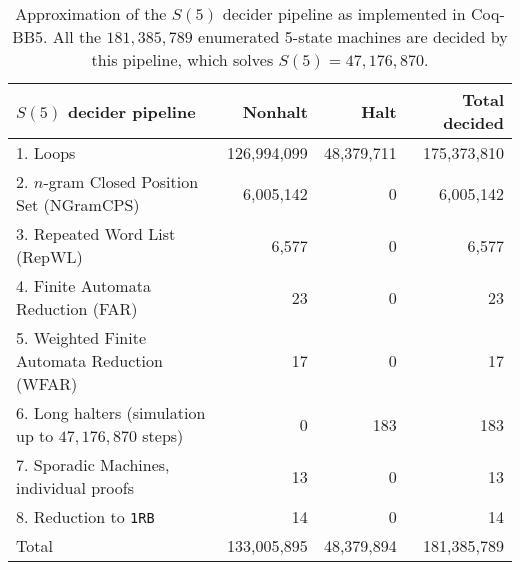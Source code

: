 \documentclass{easychair}
\newcommand{\BBtheFifth}{47{,}176{,}870}
\newcommand{\BBtheFifthTNF}{181{,}385{,}789}
\newcommand{\CoqBB}{Coq-BB5\xspace}
\theoremstyle{definition} %
\numberwithin{equation}{section}
\theoremstyle{definition} %
\begin{document}
\begin{table}[h!]
  \centering
  \begin{tabular}{|l|rrr|}
    \hline
    $S(5)$ decider pipeline                                & Nonhalt                         & Halt                           & Total decided \\
    \hline
    1. Loops                                               & 126,994,099                     & 48,379,711                     & 175,373,810   \\
    2. $n$-gram Closed Position Set (NGramCPS)             & 6,005,142                       & 0                              & 6,005,142     \\
    3. Repeated Word List (RepWL)                          & 6,577                           & 0                              & 6,577         \\
    4. Finite Automata Reduction (FAR)                     & 23                              & 0                              & 23            \\
    5. Weighted Finite Automata Reduction (WFAR)           & 17                              & 0                              & 17            \\
    
    6. Long halters (simulation up to $\BBtheFifth$ steps) & 0                               & 183                            & 183           \\
    7. Sporadic Machines, individual proofs                & 13                              & 0                              & 13            \\
    8. Reduction to \texttt{1RB}                           & 14                              & 0                              & 14            \\ \hline
    Total                                                  & \multicolumn{1}{r}{133,005,895} & \multicolumn{1}{r}{48,379,894} & 181,385,789   \\ \hline
  \end{tabular}
  \caption{Approximation of the $S(5)$ decider pipeline as implemented in \CoqBB. All the $\BBtheFifthTNF$ enumerated 5-state machines are decided by this pipeline, which solves $S(5) = \BBtheFifth$. }\label{tab:pipelineBB5}
\end{table}

\newpage
\end{document}
